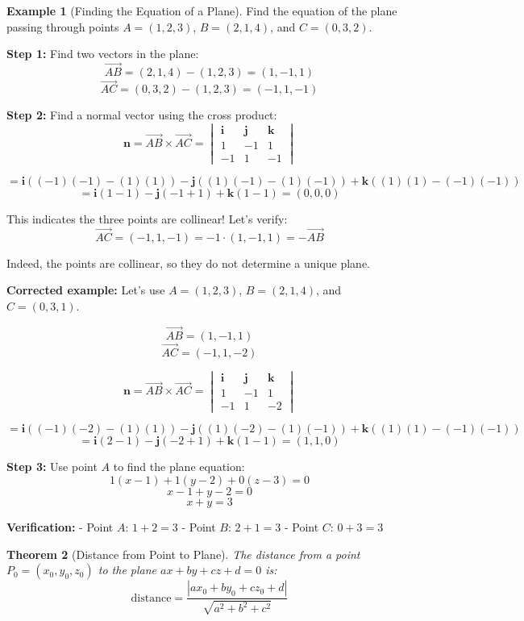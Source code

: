 \documentclass[12pt]{article}
\numberwithin{equation}{section}
\newcommand{\vect}[1]{\boldsymbol{#1}}   %
\theoremstyle{plain}
\newtheorem{theorem}{Theorem}[section]
\theoremstyle{definition}
\newtheorem{example}[theorem]{Example}
\theoremstyle{remark}
\begin{document}
\begin{example}[Finding the Equation of a Plane]
Find the equation of the plane passing through points $A = (1, 2, 3)$, $B = (2, 1, 4)$, and $C = (0, 3, 2)$.

\textbf{Step 1:} Find two vectors in the plane:
$$\overrightarrow{AB} = (2, 1, 4) - (1, 2, 3) = (1, -1, 1)$$
$$\overrightarrow{AC} = (0, 3, 2) - (1, 2, 3) = (-1, 1, -1)$$

\textbf{Step 2:} Find a normal vector using the cross product:
$$\vect{n} = \overrightarrow{AB} \times \overrightarrow{AC} = \begin{vmatrix} \vect{i} & \vect{j} & \vect{k} \\ 1 & -1 & 1 \\ -1 & 1 & -1 \end{vmatrix}$$

$$= \vect{i}((-1)(-1) - (1)(1)) - \vect{j}((1)(-1) - (1)(-1)) + \vect{k}((1)(1) - (-1)(-1))$$
$$= \vect{i}(1 - 1) - \vect{j}(-1 + 1) + \vect{k}(1 - 1) = (0, 0, 0)$$

This indicates the three points are collinear! Let's verify:
$$\overrightarrow{AC} = (-1, 1, -1) = -1 \cdot (1, -1, 1) = -\overrightarrow{AB}$$

Indeed, the points are collinear, so they do not determine a unique plane.

\textbf{Corrected example:} Let's use $A = (1, 2, 3)$, $B = (2, 1, 4)$, and $C = (0, 3, 1)$.

$$\overrightarrow{AB} = (1, -1, 1)$$
$$\overrightarrow{AC} = (-1, 1, -2)$$

$$\vect{n} = \overrightarrow{AB} \times \overrightarrow{AC} = \begin{vmatrix} \vect{i} & \vect{j} & \vect{k} \\ 1 & -1 & 1 \\ -1 & 1 & -2 \end{vmatrix}$$

$$= \vect{i}((-1)(-2) - (1)(1)) - \vect{j}((1)(-2) - (1)(-1)) + \vect{k}((1)(1) - (-1)(-1))$$
$$= \vect{i}(2 - 1) - \vect{j}(-2 + 1) + \vect{k}(1 - 1) = (1, 1, 0)$$

\textbf{Step 3:} Use point $A$ to find the plane equation:
$$1(x - 1) + 1(y - 2) + 0(z - 3) = 0$$
$$x - 1 + y - 2 = 0$$
$$x + y = 3$$

\textbf{Verification:}
- Point $A$: $1 + 2 = 3$ \checkmark
- Point $B$: $2 + 1 = 3$ \checkmark  
- Point $C$: $0 + 3 = 3$ \checkmark
\end{example}

\begin{theorem}[Distance from Point to Plane]
The distance from a point $P_0 = (x_0, y_0, z_0)$ to the plane $ax + by + cz + d = 0$ is:
$$\text{distance} = \frac{|ax_0 + by_0 + cz_0 + d|}{\sqrt{a^2 + b^2 + c^2}}$$
\end{theorem}
\end{document}
